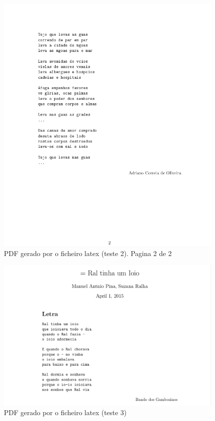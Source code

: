\begin{figure}
\includegraphics[width=15cm]{anexos/2-5/2-5-b-img2.png}
\caption{PDF gerado por o ficheiro latex (teste 2). Pagina 2 de 2}
\label{fig::anex-music-test-img}
\end{figure}

\begin{figure}
\centering
\includegraphics[width=15cm]{anexos/2-5/2-5-c-img.png}
\caption{PDF gerado por o ficheiro latex (teste 3)}
\label{fig::anex-music-test-img03}
\end{figure}